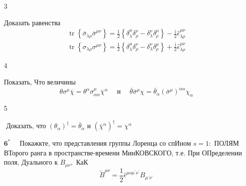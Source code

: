 \documentclass[a4paper,12pt]{article} %
\begin{document}
\begin{task}

3

Доказать равенства
$$
\begin{array}{l}
\operatorname{tr}\left\{\bar{\sigma}_{\lambda \rho} \bar{\sigma}^{\mu \nu}\right\}=\frac{1}{2}\left\{\delta_{\lambda}^{\mu} \delta_{\rho}^{\nu}-\delta_{\lambda}^{\nu} \delta_{\rho}^{\mu}\right\}-\frac{\mathrm{i}}{2} \hat{\epsilon}_{\lambda \rho}^{\mu \nu} \\
\operatorname{tr}\left\{\sigma_{\lambda \rho} \sigma^{\mu \nu}\right\}=\frac{1}{2}\left\{\delta_{\lambda}^{\mu} \delta_{\rho}^{\nu}-\delta_{\lambda}^{\nu} \delta_{\rho}^{\mu}\right\}+\frac{\mathrm{i}}{2} \hat{\epsilon}_{\lambda \rho}^{\mu \nu}
\end{array}
$$


\end{task}



\begin{task}

4

Показать, Что величины
$$
\theta \sigma^{\mu} \bar{\chi}=\theta^{\alpha} \sigma_{\alpha \dot{\alpha}}^{\mu} \bar{\chi}^{\dot{\alpha}} \quad \text { и } \quad \bar{\theta} \bar{\sigma}^{\mu} \chi=\bar{\theta}_{\dot{\alpha}}\left(\bar{\sigma}^{\mu}\right)^{\dot{\alpha} \alpha} \chi_{\alpha}
$$


\end{task}



\begin{task}
5

$\text { Доказать, что }\left(\theta_{\alpha}\right)^{\dagger}=\bar{\theta}_{\dot{\alpha}} \text { и }\left(\bar{\chi}^{\dot{\alpha}}\right)^{\dagger}=\chi^{\alpha}$



\end{task}



\begin{task}

$\mathbf{6}^{*} \quad$ Покажкте, что представления группы Лоренца со спИном $s=1:$
ПОЛЯМ ВТорого ранга в пространстве-времени МинКОВСКОГО, т.е. При ОПределении поля, Дуального к $B_{\mu \nu},$ КаК
$$
\tilde{B}^{\mu \nu}=\frac{1}{2} \hat{\epsilon}^{\mu \nu \mu^{\prime} \nu^{\prime}} B_{\mu^{\prime} \nu^{\prime}}
$$


\end{task}
\end{document}
